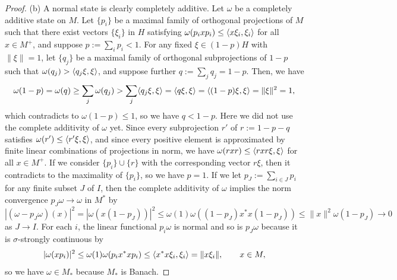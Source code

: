 \documentclass{../../large}
\begin{document}
\begin{proof}
(b)
A normal state is clearly completely additive.
Let $\omega$ be a completely additive state on $M$.
Let $\{p_i\}$ be a maximal family of orthogonal projections of $M$ such that there exist vectors $\{\xi_i\}$ in $H$ satisfying $\omega(p_ixp_i)\le\langle x\xi_i,\xi_i\rangle$ for all $x\in M^+$, and suppose $p:=\sum_ip_i<1$.
For any fixed $\xi\in(1-p)H$ with $\|\xi\|=1$, let $\{q_j\}$ be a maximal family of orthogonal subprojections of $1-p$ such that $\omega(q_j)>\langle q_j\xi,\xi\rangle$, and suppose further $q:=\sum_jq_j=1-p$.
Then, we have
\[\omega(1-p)=\omega(q)\ge\sum_j\omega(q_j)>\sum_j\langle q_j\xi,\xi\rangle=\langle q\xi,\xi\rangle=\langle(1-p)\xi,\xi\rangle=\|\xi\|^2=1,\]
which contradicts to $\omega(1-p)\le1$, so we have $q<1-p$.
Here we did not use the complete additivity of $\omega$ yet.
Since every subprojection $r'$ of $r:=1-p-q$ satisfies $\omega(r')\le\langle r'\xi,\xi\rangle$, and since every positive element is approximated by finite linear combinations of projections in norm, we have $\omega(rxr)\le\langle rxr\xi,\xi\rangle$ for all $x\in M^+$.
If we consider $\{p_i\}\cup\{r\}$ with the corresponding vector $r\xi$, then it contradicts to the maximality of $\{p_i\}$, so we have $p=1$.
If we let $p_J:=\sum_{i\in J}p_i$ for any finite subset $J$ of $I$, then the complete additivity of $\omega$ implies the norm convergence $p_J\omega\to\omega$ in $M^*$ by
\[|(\omega-p_J\omega)(x)|^2=|\omega(x(1-p_J))|^2\le\omega(1)\omega((1-p_J)x^*x(1-p_J))\le\|x\|^2\omega(1-p_J)\to0\]
as $J\to I$.
For each $i$, the linear functional $p_i\omega$ is normal and so is $p_J\omega$ because it is $\sigma$-strongly continuous by
\[|\omega(xp_i)|^2\le\omega(1)\omega(p_ix^*xp_i)\le\langle x^*x\xi_i,\xi_i\rangle=\|x\xi_i\|,\qquad x\in M,\]
so we have $\omega\in M_*$ because $M_*$ is Banach.
\end{proof}
\end{document}
